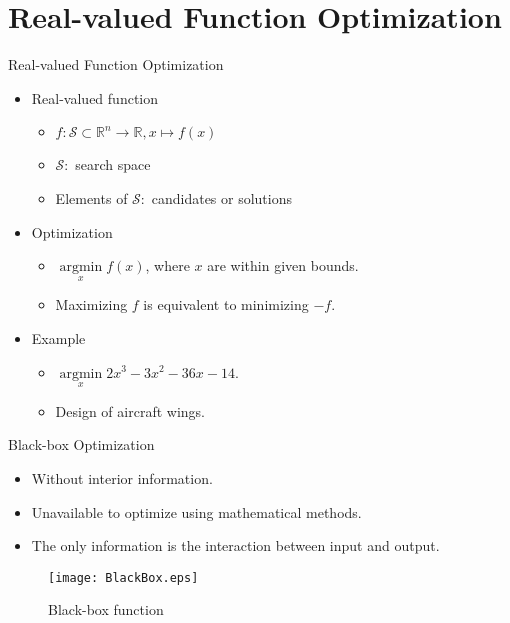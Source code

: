 

\section{Real-valued Function Optimization}

\begin{frame}{Real-valued Function Optimization}
  \begin{itemize}
    \item{Real-valued function}
      \begin{itemize}
        \item $f \colon \mathcal{S} \subset \mathbb{R}^n \to
          \mathbb{R},x \mapsto f(x)$
        \item $\mathcal{S} \colon $ search space
        \item Elements of $\mathcal{S} \colon $ candidates or solutions
      \end{itemize}
    \item{Optimization}
      \begin{itemize}
        \item $\mathop{\arg\min}\limits_{x} f(x)$, where $x$ are within given bounds.
        \item Maximizing $f$ is equivalent to minimizing $-f$.
      \end{itemize}
    \item Example
      \begin{itemize}
        \item $\mathop{\arg\min}\limits_x 2x^3-3x^2-36x-14$.
        \item Design of aircraft wings.
      \end{itemize}
  \end{itemize}
\end{frame}

\begin{frame}{Black-box Optimization}

  \begin{itemize}
    \item Without interior information.
    \item Unavailable to optimize using mathematical methods. 
    \item The only information is the interaction between input and
      output.  
  \end{itemize}
  \begin{figure}[b]
    \texttt{[image: BlackBox.eps]}
    \caption{Black-box function}  
  \end{figure}

\end{frame}

